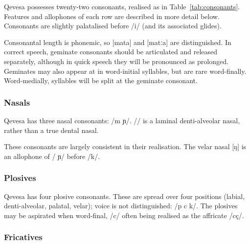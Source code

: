 \documentclass[grammar]{subfiles}
\begin{document}
  Qevesa possesses twenty-two consonants, realised as in Table~\ref{tab:consonants}.  Features and allophones of each row are described in more detail below.  Consonants are slightly palatalised before /i/ (and its associated glides).

  Consonantal length is phonemic, so [mata] and [matːa] are distinguished.  In correct speech, geminate consonants should be articulated and released separately, although in quick speech they will be pronounced as prolonged.  Geminates may also appear at in word-initial syllables, but are rare word-finally.  Word-medially, syllables will be split at the geminate consonant.

  \subsubsection{Nasals}
  \label{sssec:nasals}

  Qevesa has three nasal consonants: /m  ɲ/.  // is a laminal denti-alveolar nasal, rather than a true dental nasal. 

  These consonants are largely consistent in their realisation. 
  The velar nasal [ŋ] is an allophone of / ɲ/ before /k/.

  \subsubsection{Plosives}
  \label{sssec:plosives}

  Qevesa has four plosive consonants.  These are spread over four positions (labial, denti-alveolar, palatal, velar); voice is not distinguished: /p  c k/.  The plosives may be aspirated when word-final, /c/ often being realised as the affricate /cç/.
  

  \subsubsection{Fricatives}
  \label{sssec:fricatives}
\end{document}
